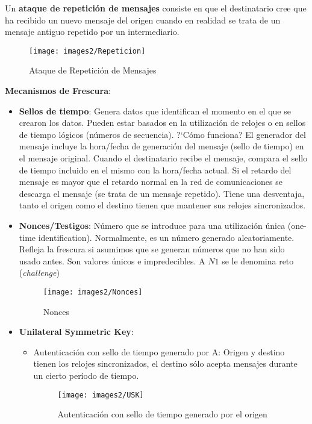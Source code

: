 \documentclass[10pt,portrait, twocolumn]{article}
\begin{document}
\quad Un \textbf{ataque de repetición de mensajes} consiste en que el destinatario cree que ha recibido un nuevo mensaje del origen cuando en realidad se trata de un mensaje antiguo repetido por un intermediario.

	\begin{figure}[ht!]
	\centering
	\texttt{[image: images2/Repeticion]}
	\caption{Ataque de Repetición de Mensajes}
	\label{table:Planta1}
	\end{figure}
	
\textbf{Mecanismos de Frescura}:

	\begin{itemize}
		\item \textbf{Sellos de tiempo}: Genera datos que identifican el momento en el que se crearon los datos. Pueden estar basados en la utilización de relojes o en sellos de tiempo lógicos (números de secuencia). ?`Cómo funciona? El generador del mensaje incluye la hora/fecha de generación del mensaje (sello de tiempo) en el mensaje original. Cuando el destinatario recibe el mensaje, compara el sello de tiempo incluido en el mismo con la hora/fecha actual. Si el retardo del mensaje es mayor que el retardo normal en la red de comunicaciones se descarga el mensaje (se trata de un mensaje repetido). Tiene una desventaja, tanto el origen como el destino tienen que mantener sus relojes sincronizados.
		\item \textbf{Nonces/Testigos}: Número que se introduce para una utilización única (one-time identification). Normalmente, es un número generado aleatoriamente. Refleja la frescura si asumimos que se generan números que no han sido usado antes. Son valores únicos e impredecibles. A $N1$ se le denomina reto (\textit{challenge})
		
			\begin{figure}[ht!]
			\centering
			\texttt{[image: images2/Nonces]}
			\caption{Nonces}
			\label{figure:Planta1}
			\end{figure}
			
		\item \textbf{Unilateral Symmetric Key}:
		
			\begin{itemize}
				\item Autenticación con sello de tiempo generado por A:  Origen y destino tienen los relojes sincronizados, el destino sólo acepta mensajes durante un cierto período de tiempo.
					\begin{figure}[ht!]
					\centering
					\texttt{[image: images2/USK]}
					\caption{Autenticación con sello de tiempo generado por el origen}
					\label{figure:Planta1}
					\end{figure}
					

\end{itemize}
\end{itemize}
\end{document}
